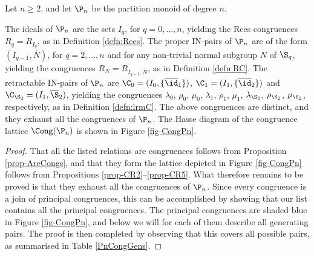 
\begin{thm}\label{thm-CongPn}
Let $n\geq2$, and let $\P_n$ be the partition monoid of degree $n$.
\begin{itemize}
 The ideals of $\P_n$ are the sets $I_q$, for $q=0,\ldots,n$, yielding the Rees congruences $R_q=R_{I_q}$, as in Definition \ref{defn:Rees}.
 The proper IN-pairs of $\P_n$ are of the form $(I_{q-1},\overline N)$, for $q=2,\ldots,n$ and for any non-trivial normal subgroup $N$ of $\S_q$, yielding the congruences $R_N=R_{I_{q-1},\overline N}$, as in Definition \ref{defn:RC}.
 The retractable IN-pairs of $\P_n$ are $\C_0=(I_0,\{\overline{\id}_1\})$, $\C_1=(I_1,\{\overline{\id}_2\})$ and $\C_{\S_2}=(I_1,\overline{\S}_2)$, yielding the congruences $\lambda_0$, $\rho_0$, $\mu_0$, $\lambda_1$, $\rho_1$, $\mu_1$, $\lambda_{\S_2}$, $\rho_{\S_2}$, $\mu_{\S_2}$, respectively, as in Definition \ref{defn:lrmC}.
 The above congruences are distinct, and they exhaust all the congruences of $\P_n$.
 The Hasse diagram of the congruence lattice $\Cong(\P_n) $ is shown in Figure \ref{fig-CongPn}.
\end{itemize}
\end{thm}


\begin{proof}
That all the listed relations are congruences follows from Proposition \ref{prop-AreCongs}, and that they form the lattice depicted in Figure \ref{fig-CongPn} follows from Propositions \ref{prop-CR2}--\ref{prop-CR5}.
What therefore remains to be proved is that they exhaust all the congruences of $\P_n$.
Since every congruence is a join of principal congruences, this can be accomplished by showing that our list contains all the principal congruences.
The principal congruences are shaded blue in Figure \ref{fig-CongPn}, and below we will for each of them describe all generating pairs.
The proof is then completed by observing that this covers all possible pairs, as summarised in Table \ref{PnCongGens}.
\end{proof}



